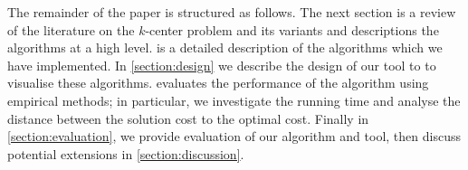 The remainder of the paper is structured as follows. The next section is a review of the literature on the $k$-center problem and its variants and descriptions the algorithms at a high level.  is a detailed description of the algorithms which we have implemented. In \cref{section:design} we describe the design of our tool to to visualise these algorithms.  evaluates the performance of the algorithm using empirical methods; in particular, we investigate the running time and analyse the distance between the solution cost to the optimal cost. Finally in \cref{section:evaluation}, we provide evaluation of our algorithm and tool, then discuss potential extensions in \cref{section:discussion}.